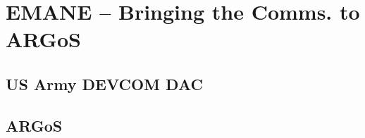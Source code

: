 \chapter{EMANE -- Bringing the Comms. to ARGoS}
\label{chapter4}


\section{US Army DEVCOM DAC}


\section{ARGoS}


